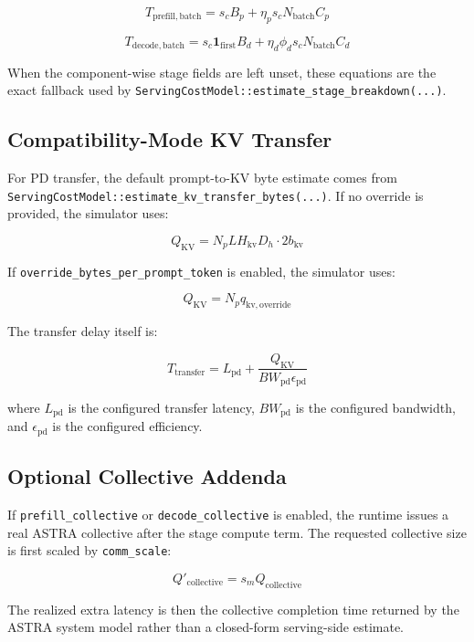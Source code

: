 \begin{equation*}
T_{\mathrm{prefill,batch}} =
s_c B_p + \eta_p s_c N_{\mathrm{batch}} C_p
\end{equation*}

\begin{equation*}
T_{\mathrm{decode,batch}} =
s_c \mathbf{1}_{\mathrm{first}} B_d +
\eta_d \phi_d s_c N_{\mathrm{batch}} C_d
\end{equation*}

When the component-wise stage fields are left unset, these equations are the
exact fallback used by \texttt{ServingCostModel::estimate\_stage\_breakdown(...)}.

\subsection{Compatibility-Mode KV Transfer}

For PD transfer, the default prompt-to-KV byte estimate comes from
\texttt{ServingCostModel::estimate\_kv\_transfer\_bytes(...)}. If no override is
provided, the simulator uses:

\begin{equation*}
Q_{\mathrm{KV}} =
N_p L H_{\mathrm{kv}} D_h \cdot 2 b_{\mathrm{kv}}
\end{equation*}

If \texttt{override\_bytes\_per\_prompt\_token} is enabled, the simulator uses:

\begin{equation*}
Q_{\mathrm{KV}} =
N_p q_{\mathrm{kv,override}}
\end{equation*}

The transfer delay itself is:

\begin{equation*}
T_{\mathrm{transfer}} =
L_{\mathrm{pd}} +
\frac{Q_{\mathrm{KV}}}{BW_{\mathrm{pd}} \epsilon_{\mathrm{pd}}}
\end{equation*}

where \(L_{\mathrm{pd}}\) is the configured transfer latency,
\(BW_{\mathrm{pd}}\) is the configured bandwidth, and
\(\epsilon_{\mathrm{pd}}\) is the configured efficiency.

\subsection{Optional Collective Addenda}

If \texttt{prefill\_collective} or \texttt{decode\_collective} is enabled, the
runtime issues a real ASTRA collective after the stage compute term. The
requested collective size is first scaled by \texttt{comm\_scale}:

\begin{equation*}
Q'_{\mathrm{collective}} =
s_m Q_{\mathrm{collective}}
\end{equation*}

The realized extra latency is then the collective completion time returned by
the ASTRA system model rather than a closed-form serving-side estimate.
